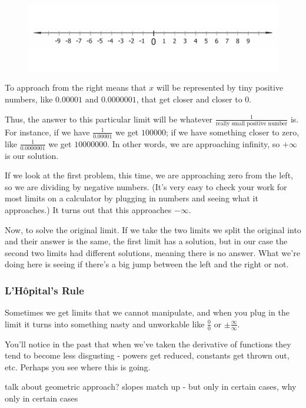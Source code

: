 \begin{figure}[H]
\centering
\includegraphics[scale=0.5]{numberline.jpg}
\end{figure}

To approach from the right means that $x$ will be represented by tiny positive numbers, like $0.00001$ and $0.0000001$, that get closer and closer to $0$. 

Thus, the answer to this particular limit will be whatever $\frac{1}{\text{really small positive number}}$ is. 
For instance, if we have $\frac{1}{0.00001}$ we get $100000$; if we have something closer to zero, like $\frac{1}{0.0000001}$ we get $10000000$. 
In other words, we are approaching infinity, so $+\infty$ is our solution.

If we look at the first problem, this time, we are approaching zero from the left, so we are dividing by negative numbers. (It's very easy to check your work for most limits on a calculator by plugging in numbers and seeing what it approaches.) It turns out that this approaches $-\infty$. 

Now, to solve the original limit. 
If we take the two limits we split the original into and their answer is the same, the first limit has a solution, but in our case the second two limits had different solutions, meaning there is no answer. What we're doing here is seeing if there's a big jump between the left and the right or not.

\subsubsection{L'H\^{o}pital's Rule}

Sometimes we get limits that we cannot manipulate, and when you plug in the limit it turns into something nasty and unworkable like $\frac{0}{0}$ or $\pm\frac{\infty}{\infty}$.

You'll notice in the past that when we've taken the derivative of functions they tend to become less disgusting - powers get reduced, constants get thrown out, etc. Perhaps you see where this is going.

talk about geometric approach? slopes match up - but only in certain cases, why only in certain cases